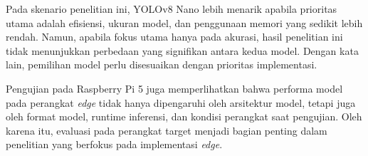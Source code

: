 \begin{sectioncontent}
\begin{sectioncontent}
        Pada skenario penelitian ini, YOLOv8 Nano lebih menarik apabila prioritas utama adalah efisiensi, ukuran model, dan penggunaan memori yang sedikit lebih rendah. Namun, apabila fokus utama hanya pada akurasi, hasil penelitian ini tidak menunjukkan perbedaan yang signifikan antara kedua model. Dengan kata lain, pemilihan model perlu disesuaikan dengan prioritas implementasi.

        Pengujian pada Raspberry Pi 5 juga memperlihatkan bahwa performa model pada perangkat \textit{edge} tidak hanya dipengaruhi oleh arsitektur model, tetapi juga oleh format model, runtime inferensi, dan kondisi perangkat saat pengujian. Oleh karena itu, evaluasi pada perangkat target menjadi bagian penting dalam penelitian yang berfokus pada implementasi \textit{edge}.
    \end{sectioncontent}
\end{sectioncontent}